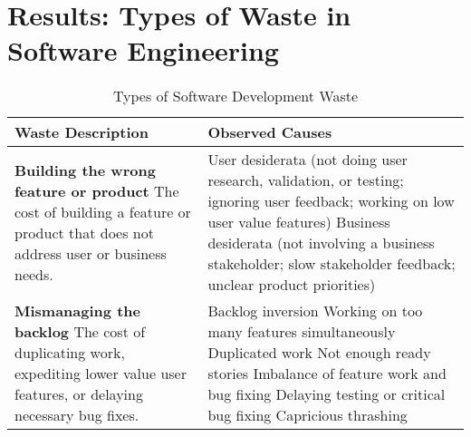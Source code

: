 \section{Results: Types of Waste in Software Engineering}
\label{SEWaste}

\begin{table*}[htbp]
\renewcommand{\arraystretch}{1.3}
\centering
\caption{Types of Software Development Waste}
\label{Waste}
\begin{tabular}{|p{2.5in}|p{3.6in}|} %
\hline
\textbf{Waste} \newline Description & Observed Causes   
\\ \hline
\textbf{Building the wrong feature or product} \newline 
The cost of building a feature or product that does not address user or business needs. & 
User desiderata (not doing user research, validation, or testing; ignoring user feedback; working on low user value features) \newline 
Business desiderata (not involving a business stakeholder; slow stakeholder feedback; unclear product priorities)                                                                                                                                                                                  \\ \hline
\textbf{Mismanaging the backlog} \newline
The cost of duplicating work, expediting lower value user features, or delaying necessary bug fixes.  & 
Backlog inversion \newline Working on too many features simultaneously \newline Duplicated work \newline Not enough ready stories  \newline Imbalance of feature work and bug fixing \newline Delaying testing or critical bug fixing \newline Capricious thrashing                                                                                                                                                                                                                                                                                                                                    \\ \hline

\end{tabular}
\end{table*}

